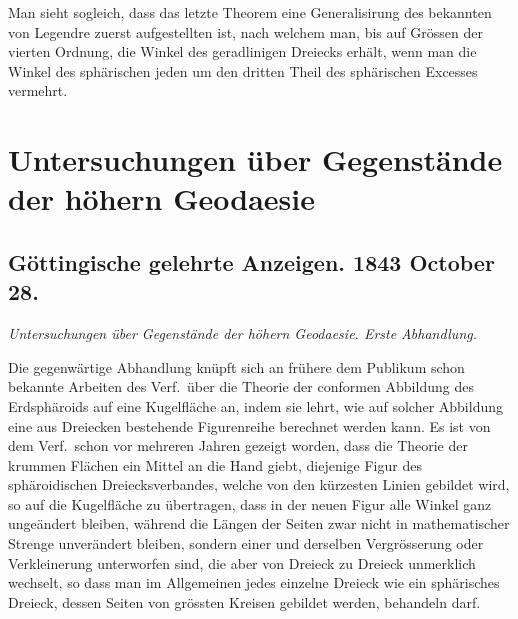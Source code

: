 \documentclass[fontsize=10pt,paper=a5,pagesize,headings=small,headinclude=true,footinclude=true]{scrbook}
\begin{document}
Man sieht sogleich, dass das letzte Theorem eine Generalisirung des bekannten von Legendre zuerst aufgestellten ist, nach welchem man, bis auf Grössen der vierten Ordnung, die Winkel des geradlinigen Dreiecks erhält, wenn man die Winkel des sphärischen jeden um den dritten Theil des sphärischen Excesses vermehrt.

\newpage
\section*{Untersuchungen über Gegenstände der höhern Geodaesie}

\subsection*{Göttingische gelehrte Anzeigen. 1843 October 28.}

\textit{Untersuchungen über Gegenstände der höhern Geodaesie. Erste Abhandlung.}

Die gegenwärtige Abhandlung knüpft sich an frühere dem Publikum schon bekannte Arbeiten des Verf.~über die Theorie der conformen Abbildung des Erdsphäroids auf eine Kugelfläche an, indem sie lehrt, wie auf solcher Abbildung eine aus Dreiecken bestehende Figurenreihe berechnet werden kann. Es ist von dem Verf.~schon vor mehreren Jahren gezeigt worden, dass die Theorie der krummen Flächen ein Mittel an die Hand giebt, diejenige Figur des sphäroidischen Dreiecksverbandes, welche von den kürzesten Linien gebildet wird, so auf die Kugelfläche zu übertragen, dass in der neuen Figur alle Winkel ganz ungeändert bleiben, während die Längen der Seiten zwar nicht in mathematischer Strenge unverändert bleiben, sondern einer und derselben Vergrösserung oder Verkleinerung unterworfen sind, die aber von Dreieck zu Dreieck unmerklich wechselt, so dass man im Allgemeinen jedes einzelne Dreieck wie ein sphärisches Dreieck, dessen Seiten von grössten Kreisen gebildet werden, behandeln darf.
\end{document}

